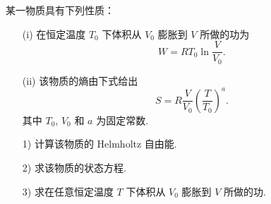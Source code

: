\documentclass{assignment}
\begin{document}
\begin{prob}
    某一物质具有下列性质：
    \begin{itemize}
        \item[(i)] 在恒定温度 $T_0$ 下体积从 $V_0$ 膨胀到 $V$ 所做的功为
        \[
            W=RT_0\ln\frac{V}{V_0}.
        \]
        \item[(ii)] 该物质的熵由下式给出
        \[
            S=R\frac{V}{V_0}\left(\frac{T}{T_0}\right)^a.
        \]
        其中 $T_0$, $V_0$ 和 $a$ 为固定常数.
    \end{itemize}
    \begin{itemize}
        \item[1)] 计算该物质的 Helmholtz 自由能.
        \item[2)] 求该物质的状态方程.
        \item[3)] 求在任意恒定温度 $T$ 下体积从 $V_0$ 膨胀到 $V$ 所做的功.
    \end{itemize}
\end{prob}
\end{document}
